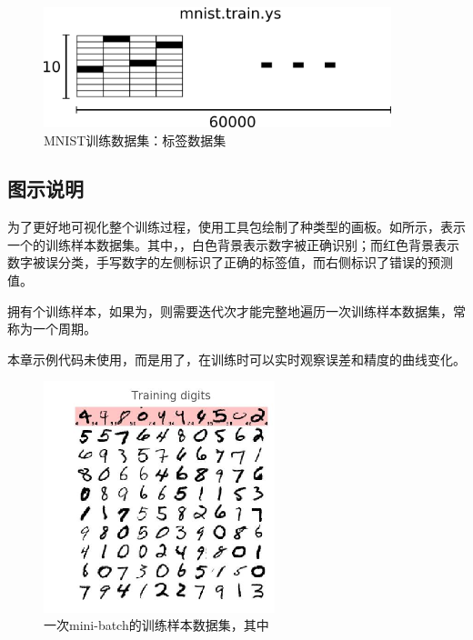 \begin{content}
\begin{figure}[H]
\centering
\includegraphics[width=0.9\textwidth]{figures/mnist-train-ys.png}
\caption{MNIST训练数据集：标签数据集}
 \label{fig:mnist-train-ys}
\end{figure}

\subsection{图示说明}

\begin{content}

为了更好地可视化整个训练过程，使用工具包绘制了种类型的画板。如所示，表示一个的训练样本数据集。其中，，白色背景表示数字被正确识别；而红色背景表示数字被误分类，手写数字的左侧标识了正确的标签值，而右侧标识了错误的预测值。

拥有个训练样本，如果为，则需要迭代次才能完整地遍历一次训练样本数据集，常称为一个周期。

\begin{remark}
本章示例代码未使用，而是用了，在训练时可以实时观察误差和精度的曲线变化。
\end{remark}

\begin{figure}[H]
\centering
\includegraphics[width=0.6\textwidth]{figures/mnist-training-digits.jpeg}
\caption{一次mini-batch的训练样本数据集，其中}
 \label{fig:mnist-training-digits}
\end{figure}


\end{content}
\end{content}
